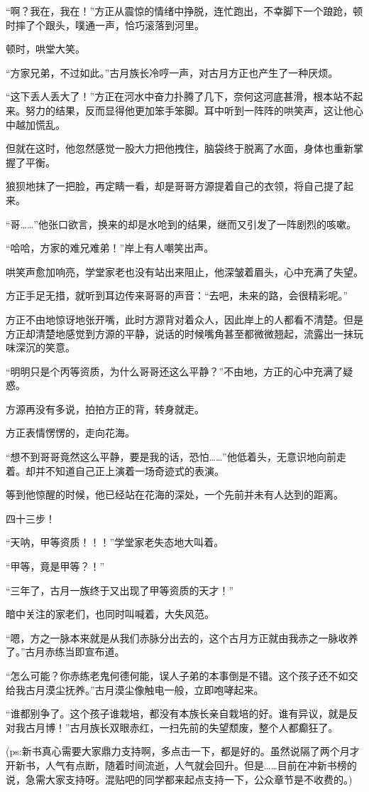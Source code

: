 \begin{this_body}
“啊？我在，我在！”方正从震惊的情绪中挣脱，连忙跑出，不幸脚下一个踉跄，顿时摔了个跟头，噗通一声，恰巧滚落到河里。

顿时，哄堂大笑。

“方家兄弟，不过如此。”古月族长冷哼一声，对古月方正也产生了一种厌烦。

“这下丢人丢大了！”方正在河水中奋力扑腾了几下，奈何这河底甚滑，根本站不起来。努力的结果，反而显得他更加笨手笨脚。耳中听到一阵阵的哄笑声，这让他心中越加慌乱。

但就在这时，他忽然感觉一股大力把他拽住，脑袋终于脱离了水面，身体也重新掌握了平衡。

狼狈地抹了一把脸，再定睛一看，却是哥哥方源提着自己的衣领，将自己提了起来。

“哥……”他张口欲言，换来的却是水呛到的结果，继而又引发了一阵剧烈的咳嗽。

“哈哈，方家的难兄难弟！”岸上有人嘲笑出声。

哄笑声愈加响亮，学堂家老也没有站出来阻止，他深皱着眉头，心中充满了失望。

方正手足无措，就听到耳边传来哥哥的声音：“去吧，未来的路，会很精彩呢。”

方正不由地惊讶地张开嘴，此时方源背对着众人，因此岸上的人都看不清楚。但是方正却清楚地感觉到方源的平静，说话的时候嘴角甚至都微微翘起，流露出一抹玩味深沉的笑意。

“明明只是个丙等资质，为什么哥哥还这么平静？”不由地，方正的心中充满了疑惑。

方源再没有多说，拍拍方正的背，转身就走。

方正表情愣愣的，走向花海。

“想不到哥哥竟然这么平静，要是我的话，恐怕……”他低着头，无意识地向前走着。却并不知道自己正上演着一场奇迹式的表演。

等到他惊醒的时候，他已经站在花海的深处，一个先前并未有人达到的距离。

四十三步！

“天呐，甲等资质！！！”学堂家老失态地大叫着。

“甲等，竟是甲等？！”

“三年了，古月一族终于又出现了甲等资质的天才！”

暗中关注的家老们，也同时叫喊着，大失风范。

“嗯，方之一脉本来就是从我们赤脉分出去的，这个古月方正就由我赤之一脉收养了。”古月赤练当即宣布道。

“怎么可能？你赤练老鬼何德何能，误人子弟的本事倒是不错。这个孩子还不如交给我古月漠尘抚养。”古月漠尘像触电一般，立即咆哮起来。

“谁都别争了。这个孩子谁栽培，都没有本族长亲自栽培的好。谁有异议，就是反对我古月博！”古月族长双眼赤红，一扫先前的失望颓废，整个人都癫狂了。

(ps:新书真心需要大家鼎力支持啊，多点击一下，都是好的。虽然说隔了两个月才开新书，人气有点断，随着时间流逝，人气就会回升。但是……目前在冲新书榜的说，急需大家支持呀。混贴吧的同学都来起点支持一下，公众章节是不收费的。)

\end{this_body}

